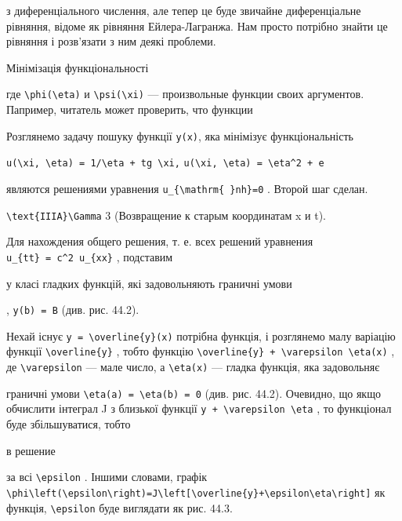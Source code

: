 \documentclass[
  ukrainian,
]{article}
\begin{document}
з диференціального числення, але тепер це буде звичайне диференціальне
рівняння, відоме як рівняння Ейлера-Лагранжа. Нам просто потрібно знайти
це рівняння і розв'язати з ним деякі проблеми.

Мінімізація функціональності

где \texttt{\textbackslash{}phi(\textbackslash{}eta)} и
\texttt{\textbackslash{}psi(\textbackslash{}xi)} --- произвольные
функции своих аргументов. Папример, читатель может проверить, что
функции

Розглянемо задачу пошуку функції \texttt{y(x)}, яка мінімізує
функціональність

\texttt{u(\textbackslash{}xi,\ \textbackslash{}eta)\ =\ 1/\textbackslash{}eta\ +\ tg\ \textbackslash{}xi,}
\texttt{u(\textbackslash{}xi,\ \textbackslash{}eta)\ =\ \textbackslash{}eta\^{}2\ +\ e}

являются решениями уравнения
\texttt{u\_\{\textbackslash{}mathrm\{\ \}nh\}=0} . Второй шаг сделан.

\texttt{\textbackslash{}text\{IIIA\}\textbackslash{}Gamma} 3
(Возвращение к старым координатам x и t).

Для нахождения общего решения, т. е. всех решений уравнения
\texttt{u\_\{tt\}\ =\ c\^{}2\ u\_\{xx\}} , подставим

у класі гладких функцій, які задовольняють граничні умови

, \texttt{y(b)\ =\ B} (див. рис. 44.2).

Нехай існує \texttt{y\ =\ \textbackslash{}overline\{y\}(x)} потрібна
функція, і розглянемо малу варіацію функції
\texttt{\textbackslash{}overline\{y\}} , тобто функцію
\texttt{\textbackslash{}overline\{y\}\ +\ \textbackslash{}varepsilon\ \textbackslash{}eta(x)}
, де \texttt{\textbackslash{}varepsilon} --- мале число, а
\texttt{\textbackslash{}eta(x)} --- гладка функція, яка задовольняє

граничні умови
\texttt{\textbackslash{}eta(a)\ =\ \textbackslash{}eta(b)\ =\ 0} (див.
рис. 44.2). Очевидно, що якщо обчислити інтеграл J з близької функції
\texttt{y\ +\ \textbackslash{}varepsilon\ \textbackslash{}eta} , то
функціонал буде збільшуватися, тобто

в решение

за всі \texttt{\textbackslash{}epsilon} . Іншими словами, графік
\texttt{\textbackslash{}phi\textbackslash{}left(\textbackslash{}epsilon\textbackslash{}right)=J\textbackslash{}left{[}\textbackslash{}overline\{y\}+\textbackslash{}epsilon\textbackslash{}eta\textbackslash{}right{]}}
як функція, \texttt{\textbackslash{}epsilon} буде виглядати як рис.
44.3.
\end{document}
